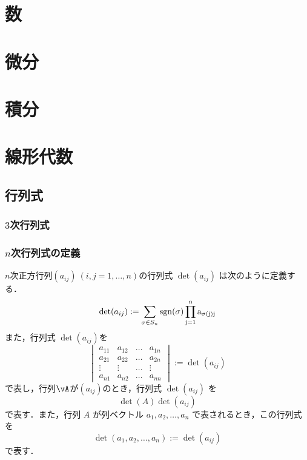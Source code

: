 \documentclass{book}　%
\begin{document}
	\tableofcontents
	\part{数}
	\part{微分}
	\part{積分}
	\part{線形代数}
		\chapter{行列式}
			\section{$3$次行列式}
			\section{$n$次行列式の定義}
				\begin{dfn} $n$次正方行列$(a_{i j}) \ (i,j = 1 ,\dots,n)$の行列式 $\det(a_{ij})$ は次のように定義する．
					\begin{equation}
						\det(a_{i j}) := \sum_{\sigma \in S_n} \rm{sgn}(\sigma) \prod_{j=1}^{n} a_{\sigma(j) j}
					\end{equation}
					また，行列式 $\det(a_{i j})$を
					\begin{equation}
						\begin{vmatrix}
							a_{1 1} & a_{1 2} & \dots & a_{1 n} \\
							a_{2 1} & a_{2 2} & \dots & a_{2 n} \\
							\vdots & \vdots & \dots & \vdots \\
							a_{n 1} & a_{n 2} & \dots & a_{n n}
						\end{vmatrix}
						:= \det(a_{i j})
					\end{equation}
					で表し，行列$\vA$が$(a_{i j})$のとき，行列式 $\det(a_{i j})$ を
					\begin{equation}
						\det(A)  \det(a_{i j})
					\end{equation}
					で表す．また，行列 $A$ が列ベクトル $a_1, a_2, \dots, a_n$ で表されるとき，この行列式を
					\begin{equation}
						\det(a_1,a_2, \dots, a_n) := \det(a_{i j})
					\end{equation}
					で表す．
				\end{dfn}
\end{document}
